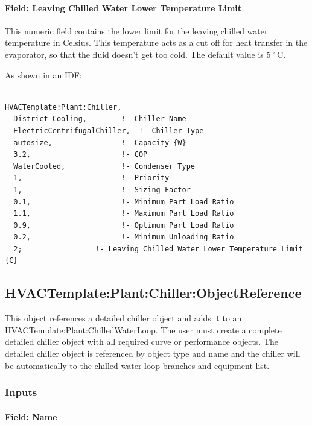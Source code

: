\paragraph{Field: Leaving Chilled Water Lower Temperature Limit}\label{field-leaving-chilled-water-lower-temperature-limit}

This numeric field contains the lower limit for the leaving chilled water temperature in Celsius. This temperature acts as a cut off for heat transfer in the evaporator, so that the fluid doesn't get too cold. The default value is 5˚C.

As shown in an IDF:

\begin{lstlisting}

HVACTemplate:Plant:Chiller,
  District Cooling,        !- Chiller Name
  ElectricCentrifugalChiller,  !- Chiller Type
  autosize,                !- Capacity {W}
  3.2,                     !- COP
  WaterCooled,             !- Condenser Type
  1,                       !- Priority
  1,                       !- Sizing Factor
  0.1,                     !- Minimum Part Load Ratio
  1.1,                     !- Maximum Part Load Ratio
  0.9,                     !- Optimum Part Load Ratio
  0.2,                     !- Minimum Unloading Ratio
  2;                 !- Leaving Chilled Water Lower Temperature Limit {C}
\end{lstlisting}

\subsection{HVACTemplate:Plant:Chiller:ObjectReference}\label{hvactemplateplantchillerobjectreference}

This object references a detailed chiller object and adds it to an HVACTemplate:Plant:ChilledWaterLoop. The user must create a complete detailed chiller object with all required curve or performance objects. The detailed chiller object is referenced by object type and name and the chiller will be automatically to the chilled water loop branches and equipment list.

\subsubsection{Inputs}\label{inputs-25-000}

\paragraph{Field: Name}\label{field-name-12-004}

